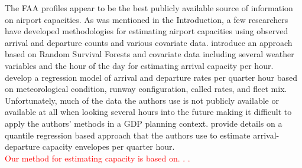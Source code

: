 \documentclass[12pt]{article}
\begin{document}
	\newline
	The FAA profiles appear to be the best publicly available source of information on airport capacities.  As was mentioned in the Introduction, a few researchers have developed methodologies for estimating airport capacities using observed arrival and departure counts and various covariate data.  \cite{gorripaty} introduce an approach based on Random Survival Forests and covariate data including several weather variables and the hour of the day for estimating arrival capacity per hour.  \cite{kim} develop a regression model of arrival and departure rates per quarter hour based on meteorological condition, runway configuration, called rates, and fleet mix.  Unfortunately, much of the data the authors use is not publicly available or available at all when looking several hours into the future making it difficult to apply the authors' methods in a GDP planning context.  \cite{ramnujam} provide details on a quantile regression based approach that the authors use to estimate arrival-departure capacity envelopes per quarter hour.\\
	\newline
	\textcolor{red}{Our method for estimating capacity is based on. . . }
\end{document}
